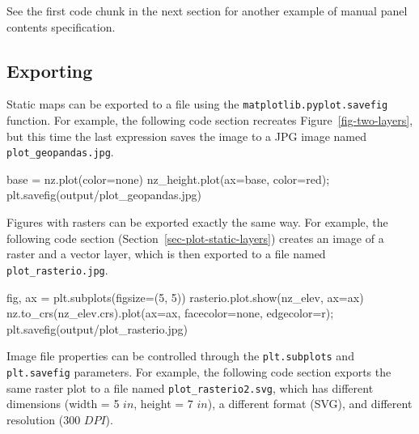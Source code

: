 \documentclass[
  letterpaper,
]{krantz}
\newenvironment{Shaded}{\begin{snugshade}}{\end{snugshade}}
\newcommand{\DecValTok}[1]{\textcolor[rgb]{0.68,0.00,0.00}{#1}}
\newcommand{\NormalTok}[1]{\textcolor[rgb]{0.00,0.23,0.31}{#1}}
\newcommand{\OperatorTok}[1]{\textcolor[rgb]{0.37,0.37,0.37}{#1}}
\newcommand{\StringTok}[1]{\textcolor[rgb]{0.13,0.47,0.30}{#1}}
\begin{document}
See the first code chunk in the next section for another example of
manual panel contents specification.

\subsection{Exporting}\label{sec-exporting-static-maps}

Static maps can be exported to a file using the
\texttt{matplotlib.pyplot.savefig} function. For example, the following
code section recreates Figure~\ref{fig-two-layers}, but this time the
last expression saves the image to a JPG image named
\texttt{plot\_geopandas.jpg}.

\begin{Shaded}
\begin{Highlighting}[]
\NormalTok{base }\OperatorTok{=}\NormalTok{ nz.plot(color}\OperatorTok{=}\StringTok{\textquotesingle{}none\textquotesingle{}}\NormalTok{)}
\NormalTok{nz\_height.plot(ax}\OperatorTok{=}\NormalTok{base, color}\OperatorTok{=}\StringTok{\textquotesingle{}red\textquotesingle{}}\NormalTok{)}\OperatorTok{;}
\NormalTok{plt.savefig(}\StringTok{\textquotesingle{}output/plot\_geopandas.jpg\textquotesingle{}}\NormalTok{)}
\end{Highlighting}
\end{Shaded}

Figures with rasters can be exported exactly the same way. For example,
the following code section (Section~\ref{sec-plot-static-layers})
creates an image of a raster and a vector layer, which is then exported
to a file named \texttt{plot\_rasterio.jpg}.

\begin{Shaded}
\begin{Highlighting}[]
\NormalTok{fig, ax }\OperatorTok{=}\NormalTok{ plt.subplots(figsize}\OperatorTok{=}\NormalTok{(}\DecValTok{5}\NormalTok{, }\DecValTok{5}\NormalTok{))}
\NormalTok{rasterio.plot.show(nz\_elev, ax}\OperatorTok{=}\NormalTok{ax)}
\NormalTok{nz.to\_crs(nz\_elev.crs).plot(ax}\OperatorTok{=}\NormalTok{ax, facecolor}\OperatorTok{=}\StringTok{\textquotesingle{}none\textquotesingle{}}\NormalTok{, edgecolor}\OperatorTok{=}\StringTok{\textquotesingle{}r\textquotesingle{}}\NormalTok{)}\OperatorTok{;}
\NormalTok{plt.savefig(}\StringTok{\textquotesingle{}output/plot\_rasterio.jpg\textquotesingle{}}\NormalTok{)}
\end{Highlighting}
\end{Shaded}

Image file properties can be controlled through the
\texttt{plt.subplots} and \texttt{plt.savefig} parameters. For example,
the following code section exports the same raster plot to a file named
\texttt{plot\_rasterio2.svg}, which has different dimensions (width = 5
\(in\), height = 7 \(in\)), a different format (SVG), and different
resolution (300 \(DPI\)).
\end{document}
